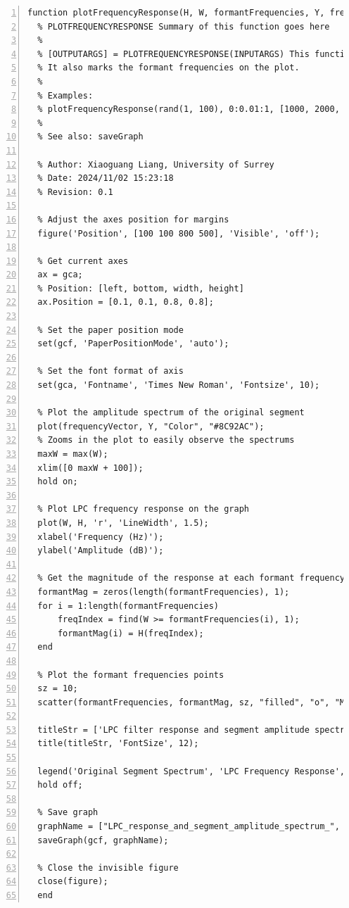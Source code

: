 \documentclass{article}
\begin{document}
\begin{lstlisting}[frame=single, numbers=left, style=Matlab-editor, caption={plotFrequencyResponse.m}, label={lst:plotFrequencyResponse}]
  function plotFrequencyResponse(H, W, formantFrequencies, Y, frequencyVector, strSegmentLen, strNthOrder, gender)
  % PLOTFREQUENCYRESPONSE Summary of this function goes here
  %
  % [OUTPUTARGS] = PLOTFREQUENCYRESPONSE(INPUTARGS) This function plots the LPC frequency response and the amplitude spectrum of a given segment.
  % It also marks the formant frequencies on the plot.
  %
  % Examples:
  % plotFrequencyResponse(rand(1, 100), 0:0.01:1, [1000, 2000, 3000], rand(1, 100), 0:0.01:1, '20', '10', 'male');
  %
  % See also: saveGraph
  
  % Author: Xiaoguang Liang, University of Surrey
  % Date: 2024/11/02 15:23:18
  % Revision: 0.1
  
  % Adjust the axes position for margins
  figure('Position', [100 100 800 500], 'Visible', 'off');
  
  % Get current axes
  ax = gca;
  % Position: [left, bottom, width, height]
  ax.Position = [0.1, 0.1, 0.8, 0.8];
  
  % Set the paper position mode
  set(gcf, 'PaperPositionMode', 'auto');
  
  % Set the font format of axis
  set(gca, 'Fontname', 'Times New Roman', 'Fontsize', 10);
  
  % Plot the amplitude spectrum of the original segment
  plot(frequencyVector, Y, "Color", "#8C92AC");
  % Zooms in the plot to easily observe the spectrums
  maxW = max(W);
  xlim([0 maxW + 100]);
  hold on;
  
  % Plot LPC frequency response on the graph
  plot(W, H, 'r', 'LineWidth', 1.5);
  xlabel('Frequency (Hz)');
  ylabel('Amplitude (dB)');
  
  % Get the magnitude of the response at each formant frequency
  formantMag = zeros(length(formantFrequencies), 1);
  for i = 1:length(formantFrequencies)
      freqIndex = find(W >= formantFrequencies(i), 1);
      formantMag(i) = H(freqIndex);
  end
  
  % Plot the formant frequencies points
  sz = 10;
  scatter(formantFrequencies, formantMag, sz, "filled", "o", "MarkerFaceColor", "b");
  
  titleStr = ['LPC filter response and segment amplitude spectrum for ', gender, ' vowel. ', 'Segment Length:', strSegmentLen, 'ms, Order:', strNthOrder];
  title(titleStr, 'FontSize', 12);
  
  legend('Original Segment Spectrum', 'LPC Frequency Response', 'First Three Formant Frequencies');
  hold off;
  
  % Save graph
  graphName = ["LPC_response_and_segment_amplitude_spectrum_", gender, '_segment_length_', strSegmentLen, 'ms_Order_', strNthOrder];
  saveGraph(gcf, graphName);
  
  % Close the invisible figure
  close(figure);
  end

\end{lstlisting}
\end{document}
